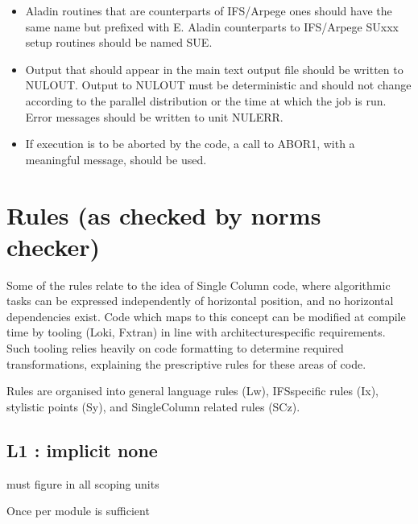\documentclass[letterpaper,10pt,english]{sphinxmanual}
\begin{document}
\begin{itemize}
\item {} 
\sphinxAtStartPar
Aladin routines that are counterparts of IFS/Arpege ones should have the same name but
prefixed with E.
Aladin counterparts to IFS/Arpege SUxxx setup routines should be named SUE.

\item {} 
\sphinxAtStartPar
Output that should appear in the main text output file should be written to NULOUT.
Output to NULOUT must be deterministic and should not change according to the
parallel distribution or the time at which the job is run.
Error messages should be written to unit NULERR.

\item {} 
\sphinxAtStartPar
If execution is to be aborted by the code, a call to ABOR1, with a meaningful message,
should be used.

\end{itemize}


\chapter{Rules (as checked by norms checker)}
\label{\detokenize{index:rules-as-checked-by-norms-checker}}
\sphinxAtStartPar
Some of the rules relate to the idea of Single Column code, where algorithmic tasks can be expressed
independently of horizontal position, and no horizontal dependencies exist. Code which maps to this
concept can be modified at compile time by tooling (Loki, Fxtran) in line with architecture\sphinxhyphen{}specific
requirements. Such tooling relies heavily on code formatting to determine required transformations,
explaining the prescriptive rules for these areas of code.

\sphinxAtStartPar
Rules are organised into general language rules (Lw), IFS\sphinxhyphen{}specific rules (Ix), stylistic
points (Sy), and Single\sphinxhyphen{}Column related rules (SCz).

\sphinxstepscope


\section{L1 : implicit none}
\label{\detokenize{rules/L1:l1-implicit-none}}\label{\detokenize{rules/L1::doc}}
\sphinxAtStartPar
{} must figure in all scoping units

\sphinxAtStartPar
Once per module is sufficient

\sphinxstepscope
\end{document}
